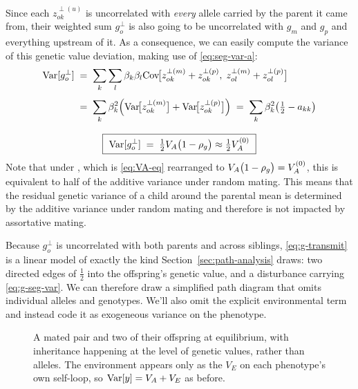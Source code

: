 \documentclass[12pt]{article}
\begin{document}
Since each $z^{\perp(u)}_{ok}$ is uncorrelated with \emph{every} allele carried by the parent it came from, their weighted sum $g^{\perp}_o$ is also going to be uncorrelated with $g_m$ and $g_p$ and everything upstream of it.
As a consequence, we can easily compute the variance of this genetic value deviation, making use of \eqref{eq:seg-var-a}:
\begin{equation}\label{eq:g-seg-var}
\begin{gathered}
\begin{aligned}
    \mathrm{Var}[g^{\perp}_o] \;&=\; \sum_k\sum_l \beta_k\beta_l \mathrm{Cov}\!\big[z^{\perp(m)}_{ok} + z^{\perp(p)}_{ok},\; z^{\perp(m)}_{ol} + z^{\perp(p)}_{ol}\big] \\[4pt]
    \;&=\; \sum_k \beta_k^2\Big(\mathrm{Var}\!\big[z^{\perp(m)}_{ok}\big] + \mathrm{Var}\!\big[z^{\perp(p)}_{ok}\big]\Big)
    \;=\; \sum_k \beta_k^2\big(\tfrac12 - a_{kk}\big)
\end{aligned} \\[8pt]
    \boxed{\ \mathrm{Var}[g^{\perp}_o] \;=\; \tfrac12 V_A\big(1 - \rho_g\big) \approx \tfrac12 V_A^{(0)} \ }
\end{gathered}
\end{equation}
Note that under , which is \eqref{eq:VA-eq} rearranged to $V_A\big(1-\rho_g\big) = V_A^{(0)}$, this is equivalent to half of the additive variance under random mating.
This means that the residual genetic variance of a child around the parental mean is determined by the additive variance under random mating and therefore is not impacted by assortative mating.

Because $g^{\perp}_o$ is uncorrelated with both parents and across siblings, \eqref{eq:g-transmit} is a linear model of exactly the kind Section~\ref{sec:path-analysis} draws: two directed edges of $\tfrac12$ into the offspring's genetic value, and a disturbance carrying \eqref{eq:g-seg-var}.
We can therefore draw a simplified path diagram that omits individual alleles and genotypes.
We'll also omit the explicit environmental term and instead code it as exogeneous variance on the phenotype.

\begin{figure}[H]
    \begin{floatcard}
        
        \caption{%
            A mated pair and two of their offspring at equilibrium, with inheritance happening at the level of genetic values, rather than alleles.
            The environment appears only as the $V_E$ on each phenotype's own self-loop, so $\mathrm{Var}[y] = V_A + V_E$ as before.%
        }
        \label{fig:g-only}
    \end{floatcard}
\end{figure}
\end{document}
